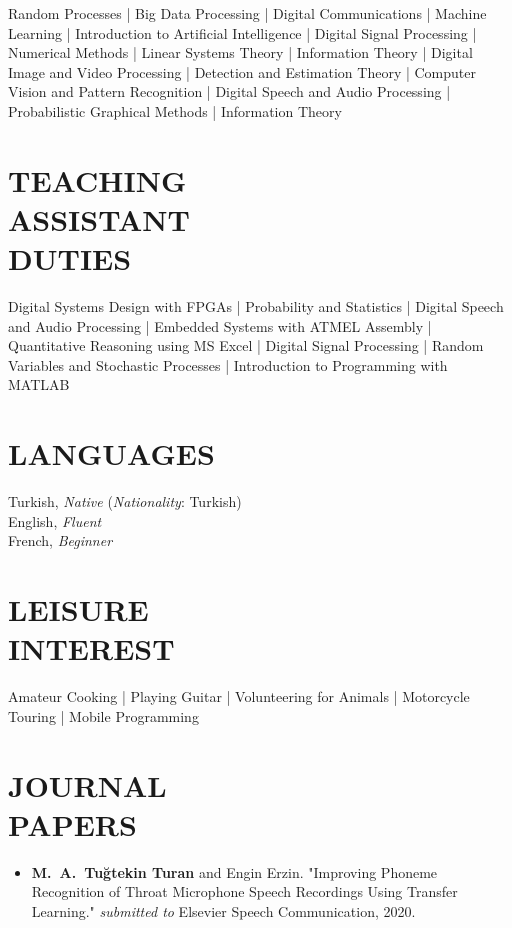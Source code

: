 \documentclass[margin, 10pt]{res} %
\begin{document}
\begin{resume}
Random Processes | Big Data Processing | Digital Communications | Machine Learning | Introduction to Artificial Intelligence | Digital Signal Processing | Numerical Methods | Linear Systems Theory | Information Theory | Digital Image and Video Processing | Detection and Estimation Theory | Computer Vision and Pattern Recognition | Digital Speech and Audio Processing | Probabilistic Graphical Methods | Information Theory

\vspace{1em}
\section{TEACHING \\ ASSISTANT \\DUTIES}
Digital Systems Design with FPGAs | Probability and Statistics | Digital Speech and Audio Processing | Embedded Systems with ATMEL Assembly | Quantitative Reasoning using MS Excel | Digital Signal Processing | Random Variables and Stochastic Processes | Introduction to Programming with MATLAB

\vspace{1em}
\section{LANGUAGES}
Turkish, \textit{Native} \hspace{.1em}(\textit{Nationality}: Turkish) \\
English, \textit{Fluent} \\
French, \textit{Beginner}

\vspace{1em}
\section{LEISURE \\ INTEREST}
Amateur Cooking | Playing Guitar | Volunteering for Animals | Motorcycle Touring | Mobile Programming

\vspace{1em}
\section{JOURNAL \\ PAPERS}

\begin{itemize}[leftmargin=*]
    \item \textbf{M.~A.~Tu\u{g}tekin Turan} and Engin Erzin. "Improving Phoneme Recognition of Throat Microphone Speech Recordings Using Transfer Learning." \textit{submitted to} Elsevier Speech Communication, 2020.


\end{itemize}
\end{resume}
\end{document}
